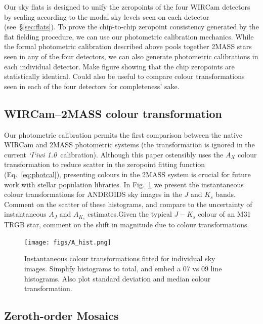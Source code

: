 \documentclass[iop]{emulateapj}
\newcommand{\sw}[1]{\textit{#1}} %
\newcommand{\iiwione}{\sw{`I`iwi 1.0}}
\newcommand{\todo}[1]{\textcolor{RedOrange}{#1}} %
\newcommand{\Fig}[1]{Fig.~\ref{fig:#1}}  %
\newcommand{\Eq}[1]{Eq.~\ref{eq:#1}}  %
\newcommand{\Sec}[1]{\S\ref{sec:#1}}  %
\begin{document}
Our sky flats is designed to unify the zeropoints of the four WIRCam detectors by scaling according to the modal sky levels seen on each detector (see~\Sec{flats}).
To prove the chip-to-chip zeropoint consistency generated by the flat fielding procedure, we can use our photometric calibration mechanics.
While the formal photometric calibration described above pools together 2MASS stars seen in any of the four detectors, we can also generate photometric calibrations in each individual detector.
\todo{Make figure showing that the chip zeropoints are statistically identical. Could also be useful to compare colour transformations seen in each of the four detectors for completeness' sake.}

\subsection{WIRCam--2MASS colour transformation}
\label{sec:color_trans}

Our photometric calibration permits the first comparison between the native WIRCam and 2MASS photometric systems (the transformation is ignored in the current \iiwione\ calibration).
Although this paper ostensibly uses the $A_X$ colour transformation to reduce scatter in the zeropoint fitting function (\Eq{photcal}), presenting colours in the 2MASS system is crucial for future work with stellar population libraries.
In \Fig{colourtrans} we present the instantaneous colour transformations for ANDROIDS sky images in the $J$ and $K_s$ bands.
\todo{Comment on the scatter of these histograms, and compare to the uncertainty of instantaneous $A_J$ and $A_{K_s}$ estimates.Given the typical $J-K_s$ colour of an M31 TRGB star, comment on the shift in magnitude due to colour transformations.}

\begin{figure}[t]
 \centering
     \texttt{[image: figs/A\_hist.png]}
 \caption{Instantaneous colour transformations fitted for individual sky images.
 \todo{Simplify histograms to total, and embed a 07 vs 09 line histograms.
 Also plot standard deviation and median colour transformation.}}
 \label{fig:colourtrans}
\end{figure}

\subsection{Zeroth-order Mosaics}
\label{sec:rawmosaic}
\end{document}

